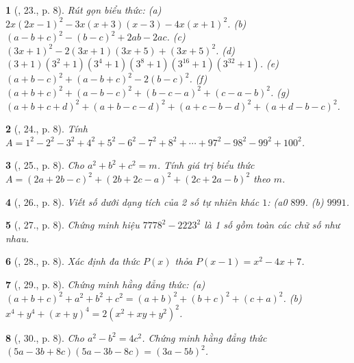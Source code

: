 \documentclass{article}
\newtheorem{baitoan}{}
\begin{document}
\begin{baitoan}[\cite{Binh_Toan_8_tap_1}, 23., p. 8]
	Rút gọn biểu thức: (a) $2x(2x - 1)^2 - 3x(x + 3)(x - 3) - 4x(x + 1)^2$. (b) $(a - b + c)^2 - (b - c)^2 + 2ab - 2ac$. (c) $(3x + 1)^2 - 2(3x + 1)(3x + 5) + (3x + 5)^2$. (d) $(3 + 1)(3^2 + 1)(3^4 + 1)(3^8 + 1)(3^{16} + 1)(3^{32} + 1)$. (e) $(a + b - c)^2 + (a - b + c)^2 - 2(b - c)^2$. (f) $(a + b + c)^2 + (a - b - c)^2 + (b - c - a)^2 + (c - a - b)^2$. (g) $(a + b + c + d)^2 + (a + b - c - d)^2 + (a + c - b - d)^2 + (a + d - b - c)^2$.
\end{baitoan}

\begin{baitoan}[\cite{Binh_Toan_8_tap_1}, 24., p. 8]
	Tính $A = 1^2 - 2^2 - 3^2 + 4^2 + 5^2 - 6^2 - 7^2 + 8^2 + \cdots + 97^2 - 98^2 - 99^2 + 100^2$.
\end{baitoan}

\begin{baitoan}[\cite{Binh_Toan_8_tap_1}, 25., p. 8]
	Cho $a^2 + b^2 + c^2 = m$. Tính giá trị biểu thức $A = (2a + 2b - c)^2 + (2b + 2c - a)^2 + (2c + 2a - b)^2$ theo $m$.
\end{baitoan}

\begin{baitoan}[\cite{Binh_Toan_8_tap_1}, 26., p. 8]
	Viết số dưới dạng tích của 2 số tự nhiên khác $1$: (a0 $899$. (b) $9991$.
\end{baitoan}

\begin{baitoan}[\cite{Binh_Toan_8_tap_1}, 27., p. 8]
	Chứng minh hiệu $7778^2 - 2223^2$ là 1 số gồm toàn các chữ số như nhau.
\end{baitoan}

\begin{baitoan}[\cite{Binh_Toan_8_tap_1}, 28., p. 8]
	Xác định đa thức $P(x)$ thỏa $P(x - 1) = x^2 - 4x + 7$.
\end{baitoan}

\begin{baitoan}[\cite{Binh_Toan_8_tap_1}, 29., p. 8]
	Chứng minh hằng đẳng thức: (a) $(a + b + c)^2 + a^2 + b^2 + c^2 = (a + b)^2 + (b + c)^2 + (c + a)^2$. (b) $x^4 + y^4 + (x + y)^4 = 2(x^2 + xy + y^2)^2$.
\end{baitoan}

\begin{baitoan}[\cite{Binh_Toan_8_tap_1}, 30., p. 8]
	Cho $a^2 - b^2 = 4c^2$. Chứng minh hằng đẳng thức $(5a - 3b + 8c)(5a - 3b - 8c) = (3a - 5b)^2$.
\end{baitoan}
\end{document}
